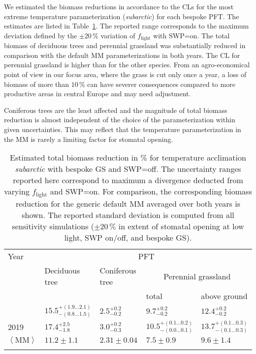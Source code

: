 \documentclass[bg, manuscript]{copernicus}
\begin{document}
We estimated the biomass reductions in accordance to the CLs \citep{ICP:MappingManual2017, ESPR:Hayes2021} for the most extreme temperature parameterization (\emph{subarctic}) for each bespoke PFT. The estimates are listed in Table~\ref{tab:biomass_reduction}. The reported range corresponds to the maximum deviation defined by the $\pm 20\,\unit{\%}$ variation of $f_\mathrm{light}$ with SWP=on. The total biomass of deciduous trees and perennial grassland was substantially reduced in comparison with the default MM parameterizations in both years. The CL for perennial grassland is higher than for the other species. From an agro-economical point of view in our focus area, where the grass is cut only once a year, a loss of biomass of more than $10\,\unit{\%}$ can have severer consequences compared to more productive areas in central Europe and may need adjustment.

Coniferous trees are the least affected and the magnitude of total biomass reduction is almost independent of the choice of the parameterization within given uncertainties. This may reflect that the temperature parameterization in the MM is rarely a limiting factor for stomatal opening.

\begin{table}[t]
  \caption{Estimated total biomass reduction in \unit{\%} for temperature acclimation \emph{subarctic} with bespoke GS and SWP=off. The uncertainty ranges reported here correspond to maximum a divergence deducted from varying $f_\mathrm{light}$ and SWP=on. For comparison, the corresponding biomass reduction for the generic default MM averaged over both years is shown. The reported standard deviation is computed from all sensitivity simulations ($\pm 20\,\unit{\%}$ in extent of stomatal opening at low light, SWP on/off, and bespoke GS).}
  \label{tab:biomass_reduction}
\begin{tabular}{lllll}
\tophline
Year & \multicolumn{4}{c}{PFT}\\
& Deciduous tree& Coniferous tree & \multicolumn{2}{c}{Perennial grassland}\\
& & & total & above ground\\
\middlehline
2018 & $15.5^{+(1.9...2.1)}_{-(0.8...1.5)}$ & $2.5^{+0.2}_{-0.2}$ & $9.7^{+0.2}_{-0.2}$ & $12.4^{+0.2}_{-0.2}$\\
2019 & $17.4^{+2.5}_{-1.8}$ & $3.0^{+0.2}_{-0.3}$ & $10.5^{+(0.1...0.2)}_{-(0.0...0.1)}$ & $13.7^{+(0.1...0.3)}_{-(0.1...0.3)}$\\
\middlehline
$\left<\mathrm{MM}\right>$ & $11.2\pm 1.1$ & $2.31\pm 0.04$ & $7.5\pm 0.9$ & $9.6\pm 1.4$\\
\bottomhline
\end{tabular}
\end{table}
\end{document}
